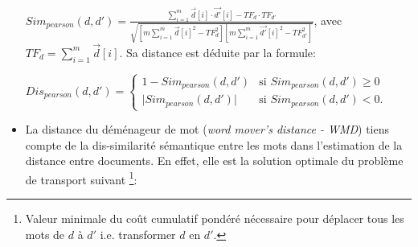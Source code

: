 \begin{itemize}
	{\footnotesize $Sim_{pearson}(d,d') = \frac{ \sum\limits^m_{i=1} \vec{d}[i] \cdot \vec{d'}[i] - TF_d\cdot TF_{d'}}{\sqrt{[m \sum\limits^m_{i=1} \vec{d}[i]^2 - TF^2_d][m \sum\limits^m_{i=1} \vec{d'}[i]^2 - TF^2_{d'}]}}$}, 
avec $TF_d = \sum\limits^m_{i=1} \vec{d}[i]$. Sa distance est déduite par la formule:

{\footnotesize $Dis_{pearson}(d,d') =
\left\{ \begin{array}{ll}
1 - Sim_{pearson}(d,d') & \text{si } Sim_{pearson}(d,d') \geq 0 \\
\vert Sim_{pearson}(d,d') \vert & \text{si } Sim_{pearson}(d,d') < 0.
\end{array}
\right.$}
	\item \og La distance du déménageur de mot \fg{} (\textit{word mover's distance - WMD}) \citep{kusner2015wordmoverdist} tiens compte de la dis-similarité sémantique entre les mots dans l'estimation de la distance entre documents. En effet, elle est la solution optimale du problème de transport suivant \footnote{Valeur minimale du coût cumulatif pondéré nécessaire pour déplacer  tous les mots de $d$ à $d'$ i.e. transformer $d$ en $d'$.}:
	

\end{itemize}
